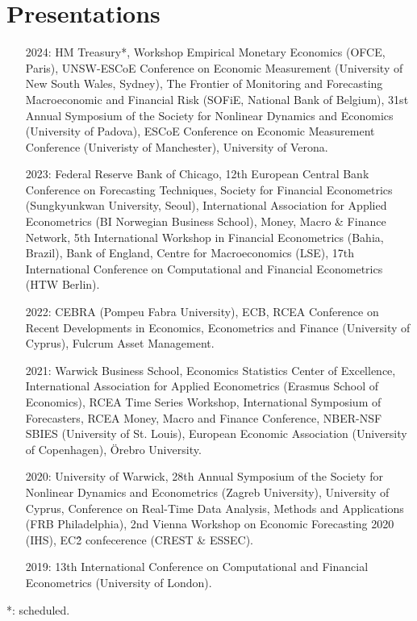 \documentclass[a4paper,12pt]{article}
\begin{document}
\section{Presentations}
\begin{itemize}
    \item[2024:] HM Treasury*, Workshop Empirical Monetary Economics (OFCE, Paris), UNSW-ESCoE Conference on Economic Measurement (University of New South Wales, Sydney), The Frontier of Monitoring and Forecasting Macroeconomic and Financial Risk (SOFiE, National Bank of Belgium), 31st Annual Symposium of the Society for Nonlinear Dynamics and Economics (University of Padova), ESCoE Conference on Economic Measurement Conference (Univeristy of Manchester), University of Verona.
    \item[2023:] Federal Reserve Bank of Chicago, 12th European Central Bank Conference on Forecasting Techniques, Society for Financial Econometrics (Sungkyunkwan University, Seoul), International Association for Applied Econometrics (BI Norwegian Business School), Money, Macro \& Finance Network, 5th International Workshop in Financial Econometrics (Bahia, Brazil), Bank of England, Centre for Macroeconomics (LSE), 17th International Conference on Computational and Financial Econometrics (HTW Berlin). 
    \item[2022:] CEBRA (Pompeu Fabra University), ECB, RCEA Conference on Recent Developments in Economics, Econometrics and Finance (University of Cyprus), Fulcrum Asset Management.
    \item[2021:] Warwick Business School, Economics Statistics Center of Excellence, International Association for Applied Econometrics (Erasmus School of Economics),  RCEA Time Series Workshop, International Symposium of Forecasters,  RCEA Money, Macro and Finance Conference, NBER-NSF SBIES (University of St. Louis), European Economic Association (University of Copenhagen), \"Orebro University.
    \item[2020:] University of Warwick, 28th Annual Symposium of the Society for Nonlinear Dynamics and Econometrics (Zagreb University), University of Cyprus, Conference on Real-Time Data Analysis, Methods and Applications (FRB Philadelphia), 2nd Vienna Workshop on Economic Forecasting 2020 (IHS), EC\^2 confecerence (CREST \& ESSEC).
    \item[2019:] 13th International Conference on Computational and Financial Econometrics (University of London).
\end{itemize}
*: scheduled.
\end{document}
